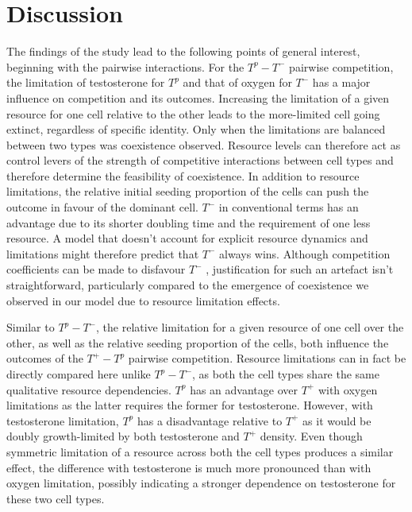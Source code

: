 \chapter{Discussion}
The findings of the study lead to the following points of general interest, beginning with the pairwise interactions. For the $T^p - T^-$ pairwise competition, the limitation of testosterone for $T^p$ and that of oxygen for $T^-$ has a major influence on competition and its outcomes. Increasing the limitation of a given resource for one cell relative to the other leads to the more-limited cell going extinct, regardless of specific identity. Only when the limitations are balanced between two types was coexistence observed. Resource levels can therefore act as control levers of the strength of competitive interactions between cell types and therefore determine the feasibility of coexistence. In addition to resource limitations, the relative initial seeding proportion of the cells can push the outcome in favour of the dominant cell. $T^-$ in conventional terms has an advantage due to its shorter doubling time and the requirement of one less resource. A model that doesn’t account for explicit resource dynamics and limitations might therefore predict that $T^-$ always wins. Although competition coefficients can be made to disfavour $T^-$ , justification for such an artefact isn’t straightforward, particularly compared to the emergence of coexistence we observed in our model due to resource limitation effects.

Similar to $T^p - T^-$, the relative limitation for a given resource of one cell over the other, as well as the relative seeding proportion of the cells, both influence the outcomes of the $T^+ - T^p$ pairwise competition. Resource limitations can in fact be directly compared here unlike $T^p - T^-$, as both the cell types share the same qualitative resource dependencies. $T^p$ has an advantage over $T^+$ with oxygen limitations as the latter requires the former for testosterone. However, with testosterone limitation, $T^p$ has a disadvantage relative to $T^+$ as it would be doubly growth-limited by both testosterone and $T^+$ density. Even though symmetric limitation of a resource across both the cell types produces a similar effect, the difference with testosterone is much more pronounced than with oxygen limitation, possibly indicating a stronger dependence on testosterone for these two cell types.

